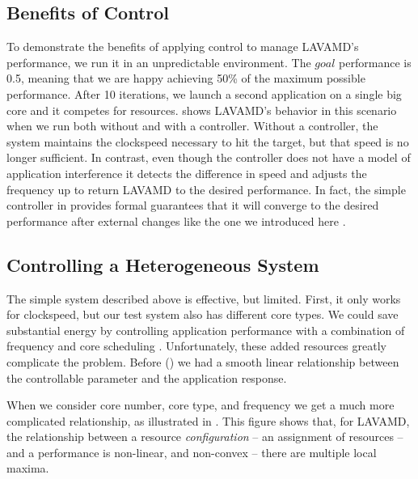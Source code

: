 \subsection{Benefits of Control}
To demonstrate the benefits of applying control to manage LAVAMD's
performance, we run it in an unpredictable environment.  The $goal$
performance is 0.5, meaning that we are happy achieving 50\% of the
maximum possible performance. After 10 iterations, we launch a second
application on a single big core and it competes for resources.
 shows LAVAMD's behavior in this scenario
when we run both without and with a controller.  Without a controller,
the system maintains the clockspeed necessary to hit the target, but
that speed is no longer sufficient.  In contrast, even though the
controller does not have a model of application interference it
detects the difference in speed and adjusts the frequency up to return
LAVAMD to the desired performance. In fact, the simple controller in
 provides formal guarantees that
it will converge to the desired performance after external changes
like the one we introduced here \cite{Hellerstein2004a}.  

\subsection{Controlling a Heterogeneous System}
The simple system described above is effective, but limited.  First,
it only works for clockspeed, but our test system also has different
core types.  We could save substantial energy by controlling
application performance with a combination of frequency and core
scheduling \cite{Carroll,Imes}.  Unfortunately, these added resources
greatly complicate the problem.  Before () we
had a smooth linear relationship between the controllable parameter
and the application response.  

When we consider core number, core type, and frequency we get a much
more complicated relationship, as illustrated in
.  This figure shows that, for LAVAMD, the
relationship between a resource \emph{configuration} -- \ie{} an
assignment of resources -- and a performance is non-linear, and
non-convex -- \ie{} there are multiple local maxima.  

\begin{figure}
  \subfloat[]
  {
    
    \label{fig:lavamd_control2}
  }
 \label{fig:learning-models}
\end{figure}

